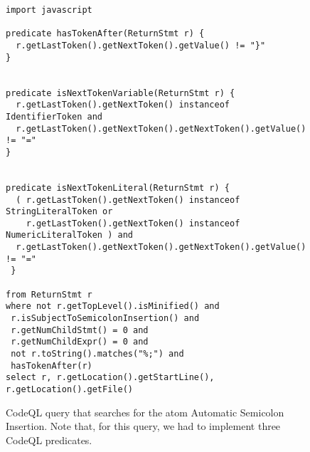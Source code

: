 \begin{figure}[htb]
\begin{lstlisting}[language=CodeQL, basicstyle=\scriptsize]
import javascript

predicate hasTokenAfter(ReturnStmt r) {
  r.getLastToken().getNextToken().getValue() != "}"
}


predicate isNextTokenVariable(ReturnStmt r) {
  r.getLastToken().getNextToken() instanceof IdentifierToken and 
  r.getLastToken().getNextToken().getNextToken().getValue() != "="
}


predicate isNextTokenLiteral(ReturnStmt r) {
  ( r.getLastToken().getNextToken() instanceof StringLiteralToken or
    r.getLastToken().getNextToken() instanceof NumericLiteralToken ) and 
  r.getLastToken().getNextToken().getNextToken().getValue() != "="
 }

from ReturnStmt r
where not r.getTopLevel().isMinified() and
 r.isSubjectToSemicolonInsertion() and 
 r.getNumChildStmt() = 0 and
 r.getNumChildExpr() = 0 and
 not r.toString().matches("%;") and
 hasTokenAfter(r) 
select r, r.getLocation().getStartLine(), r.getLocation().getFile()
\end{lstlisting}
  \caption{CodeQL query that searches for the atom Automatic Semicolon Insertion. Note that, for this query,
    we had to implement three CodeQL predicates.}
  \label{lst:codeql-automatic}
\end{figure}







